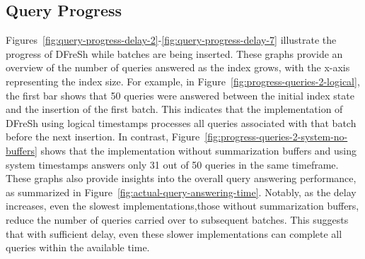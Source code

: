 \subsection{Query Progress}
Figures~\ref{fig:query-progress-delay-2}-\ref{fig:query-progress-delay-7} illustrate
the progress of DFreSh while batches are being inserted. These graphs provide an overview
of the number of queries answered as the index grows, with the x-axis representing the
index size.
%
For example, in Figure~\ref{fig:progress-queries-2-logical}, the first bar shows
that 50 queries were answered between the initial index state and the insertion of
the first batch. This indicates that the implementation of DFreSh using logical timestamps
processes all queries associated with that batch before the next insertion. In contrast,
Figure~\ref{fig:progress-queries-2-system-no-buffers} shows that the implementation
without summarization buffers and using system timestamps answers only 31 out of 50
queries in the same timeframe.
%
These graphs also provide insights into the overall query answering performance, as
summarized in Figure~\ref{fig:actual-query-answering-time}. Notably, as the delay
increases, even the slowest implementations,those without summarization buffers, reduce
the number of queries carried over to subsequent batches. This suggests that with
sufficient delay, even these slower implementations can complete all queries within
the available time.
